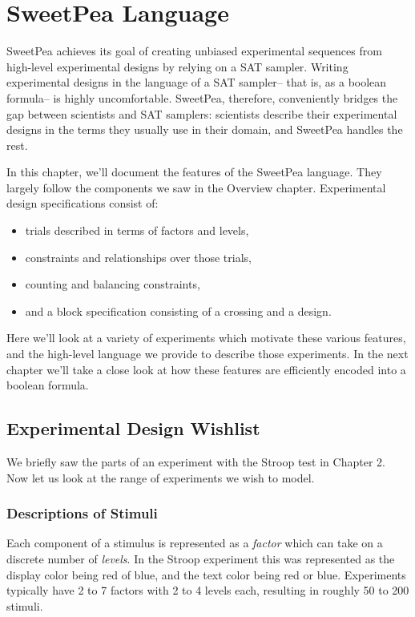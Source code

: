 
\chapter{SweetPea Language}

SweetPea achieves its goal of creating unbiased experimental sequences from high-level experimental designs by relying on a SAT sampler. Writing experimental designs in the language of a SAT sampler-- that is, as a boolean formula-- is highly uncomfortable. SweetPea, therefore, conveniently bridges the gap between scientists and SAT samplers: scientists describe their experimental designs in the terms they usually use in their domain, and SweetPea handles the rest.

In this chapter, we'll document the features of the SweetPea language. They largely follow the components we saw in the Overview chapter. Experimental design specifications consist of:
\begin{itemize}
  \item trials described in terms of factors and levels,
  \item constraints and relationships over those trials,
  \item counting and balancing constraints,
  \item and a block specification consisting of a crossing and a design.
\end{itemize}

Here we'll look at a variety of experiments which motivate these various features, and the high-level language we provide to describe those experiments. In the next chapter we'll take a close look at how these features are efficiently encoded into a boolean formula.


\section{Experimental Design Wishlist}

We briefly saw the parts of an experiment with the Stroop test in Chapter 2. Now let us look at the range of experiments we wish to model.

\subsection{Descriptions of Stimuli}

Each component of a stimulus is represented as a \emph{factor} which can take on a discrete number of \emph{levels}. In the Stroop experiment this was represented as the display color being red of blue, and the text color being red or blue. Experiments typically have 2 to 7 factors with 2 to 4 levels each, resulting in roughly 50 to 200 stimuli.

